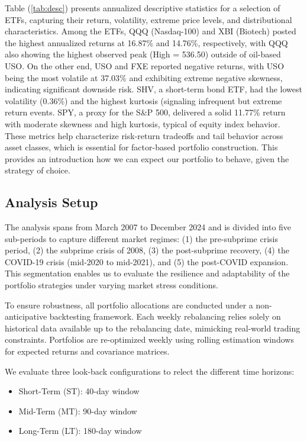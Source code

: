 \documentclass[12pt]{article}
\begin{document}
Table (\ref{tab:desc}) presents annualized descriptive statistics for a selection of ETFs, capturing their return, volatility, extreme price levels, and distributional characteristics. Among the ETFs, QQQ (Nasdaq-100) and XBI (Biotech) posted the highest annualized returns at 16.87\% and 14.76\%, respectively, with QQQ also showing the highest observed peak (High = 536.50) outside of oil-based USO. On the other end, USO and FXE reported negative returns, with USO being the most volatile at 37.03\% and exhibiting extreme negative skewness, indicating significant downside risk. SHV, a short-term bond ETF, had the lowest volatility (0.36\%) and the highest kurtosis (signaling infrequent but extreme return events. SPY, a proxy for the S\&P 500, delivered a solid 11.77\% return with moderate skewness and high kurtosis, typical of equity index behavior. These metrics help characterize risk-return tradeoffs and tail behavior across asset classes, which is essential for factor-based portfolio construction. This provides an introduction how we can expect our portfolio to behave, given the strategy of choice.

\subsection{Analysis Setup}
The analysis spans from March 2007 to December 2024 and is divided into five sub-periods to capture different market regimes: (1) the pre-subprime crisis period, (2) the subprime crisis of 2008, (3) the post-subprime recovery, (4) the COVID-19 crisis (mid-2020 to mid-2021), and (5) the post-COVID expansion. This segmentation enables us to evaluate the resilience and adaptability of the portfolio strategies under varying market stress conditions.

To ensure robustness, all portfolio allocations are conducted under a non-anticipative backtesting framework. Each weekly rebalancing relies solely on historical data available up to the rebalancing date, mimicking real-world trading constraints. Portfolios are re-optimized weekly using rolling estimation windows for expected returns and covariance matrices.

We evaluate three look-back configurations to relect the different time horizons:
\begin{itemize}
	\item Short-Term (ST): 40-day window
	\item Mid-Term (MT): 90-day window
	\item Long-Term (LT): 180-day window
\end{itemize}
\end{document}
